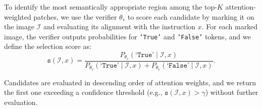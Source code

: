 \documentclass{article}
\begin{document}
To identify the most semantically appropriate region among the top-$K$ attention-weighted patches, we use the verifier $\theta_v$ to score each candidate by marking it on the image $\mathcal{I}$ and evaluating its alignment with the instruction $x$. For each marked image, the verifier outputs probabilities for \texttt{`True'} and \texttt{`False'} tokens, and we define the selection score as:
\begin{equation}
\texttt{s}(\mathcal{I}, x) = \frac{P_{\theta_v}(\texttt{`True'} \mid \mathcal{I}, x)}{P_{\theta_v}(\texttt{`True'} \mid \mathcal{I}, x) + P_{\theta_v}(\texttt{`False'} \mid \mathcal{I}, x)}.
\end{equation}

Candidates are evaluated in descending order of attention weights, and we return the first one exceeding a confidence threshold (e.g., $\texttt{s}(\mathcal{I}, x) > \gamma$) without further evaluation.


\end{document}
